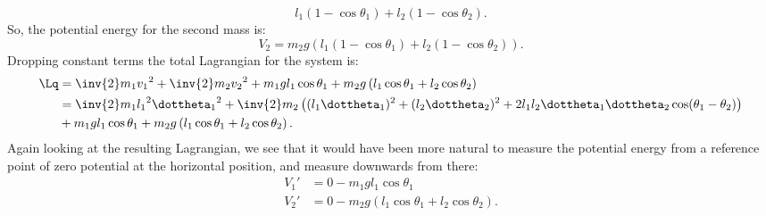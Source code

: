 {\begin{equation}
l_1 (1 - \cos\theta_1) + l_2 (1 - \cos\theta_2).
\end{equation}
%
So, the potential energy for the second mass is:
\begin{equation}\label{eqn:tongMf1:1260}
V_2 = m_2 g \left( l_1 (1 - \cos\theta_1) + l_2 (1 - \cos\theta_2) \right).
\end{equation}
%
Dropping constant terms the total Lagrangian for the system is:
%
\begin{equation}\label{eqn:tongMf1:280}
\begin{aligned}
\Lq
&= \inv{2}m_1 {v_1}^2 +\inv{2}m_2 {v_2}^2 + m_1 g l_1 \cos\theta_1 + m_2 g \left( l_1 \cos\theta_1 + l_2 \cos\theta_2 \right) \\
&=
\inv{2} m_1 {l_1}^2 {\dottheta_1}^2
+ \inv{2} m_2 \left( (l_1 \dottheta_1)^2 + (l_2 \dottheta_2)^2 + 2 l_1 l_2 \dottheta_1 \dottheta_2 \cos(\theta_1 -\theta_2) \right) \\
&+ m_1 g l_1 \cos\theta_1 + m_2 g \left( l_1 \cos\theta_1 + l_2 \cos\theta_2 \right) .
\end{aligned}
\end{equation}
%
Again looking at the resulting Lagrangian, we see that it would have been more natural to measure the potential energy from a reference point of zero potential at the horizontal position, and measure downwards from there:
%
\begin{equation}\label{eqn:tongMf1:300}
\begin{aligned}
V_1' &= 0 - m_1 g l_1 \cos\theta_1 \\
V_2' &= 0 - m_2 g \left( l_1 \cos\theta_1 + l_2 \cos\theta_2 \right).
\end{aligned}
\end{equation}
%
}
